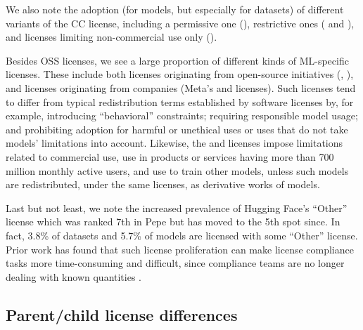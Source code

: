 We also note the adoption (for models, but especially for datasets) of different variants of the CC license, including a permissive one (), restrictive ones ( and ), and licenses limiting non-commercial use only ().%

Besides OSS licenses, we see a large proportion of different kinds of ML-specific licenses. These include both licenses originating from open-source initiatives (, ), and licenses originating from companies (\eg Meta's  and  licenses). 
Such licenses tend to differ from typical redistribution terms established by software licenses by, for example, introducing ``behavioral'' constraints; requiring responsible model usage; and prohibiting adoption for harmful or unethical uses or uses that do not take models' limitations into account. Likewise, the  and  licenses %
impose limitations related to commercial use,  use in products or services having %
more than 700 million monthly active users, and use to train other models, unless such models are redistributed, under the same licenses, as derivative works of  models. %







 Last but not least, we note the increased prevalence of Hugging Face's ``Other'' license %
 which was ranked 7th in Pepe \etal \cite{pepe2024hugging} but has moved to the 5th spot since.  %
 In fact, 3.8\% of datasets and 5.7\% of models are licensed with some ``Other'' license. Prior work has found that such license proliferation can make license compliance tasks more time-consuming and difficult, since compliance teams are no longer dealing with known quantities  \cite{wintersgill2024law}.


\subsection{Parent/child license differences} %
\label{sec:base-to-deriv-variations} %




